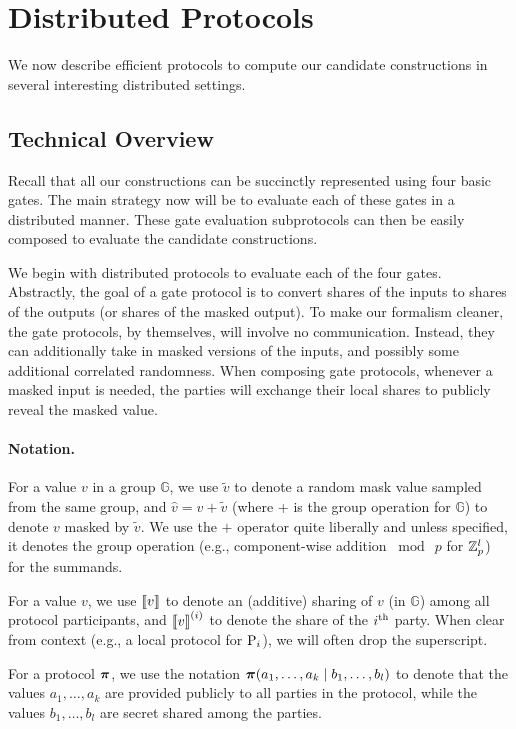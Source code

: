 \newpage
\section{Distributed Protocols}
\label{sec:distributed_protocols}
We now describe efficient protocols to compute our candidate constructions in several interesting distributed settings.

\subsection{Technical Overview}
Recall that all our constructions can be succinctly represented using four basic gates. The main strategy now will be to evaluate each of these gates in a distributed manner. These gate evaluation subprotocols can then be easily composed to evaluate the  candidate constructions. 

We begin with distributed protocols to evaluate each of the four gates. Abstractly, the goal of a gate protocol is to convert shares of the inputs to shares of the outputs (or shares of the masked output). To make our formalism cleaner, the gate protocols, by themselves, will involve no communication. Instead, they can additionally take in masked versions of the inputs, and possibly some additional correlated randomness. When composing gate protocols, whenever a masked input is needed, the parties will exchange their local shares to publicly reveal the masked value.

\paragraph{Notation.}
For a value $v$ in a group $\mathbb{G}$, we use $\tilde{v}$ to denote a random mask value sampled from the same group, and $\hat{v} = v + \tilde{v}$ (where + is the group operation for $\mathbb{G}$) to denote $v$ masked by $\tilde{v}$. We use the $+$ operator quite liberally and unless specified, it denotes the group operation (e.g., component-wise addition $\bmod~p$ for $\mathbb{Z}_p^l$) for the summands.

For a value $v$, we use $\left\llbracket v \right\rrbracket$ to denote an (additive) sharing of $v$ (in $\mathbb{G}$) among all protocol participants, and $\left\llbracket v \right\rrbracket^{(i)}$ to denote the share of the $i^{\textnormal{th}}$ party. When clear from context (e.g., a local protocol for $\textnormal{P}_i$), we will often drop the superscript. 

For a protocol $\boldsymbol{\pi}$, we use the notation $\boldsymbol{\pi}(a_1, \dots, a_k \mid b_1, \dots, b_l)$ to denote that the values $a_1, \dots, a_k$ are provided publicly to all parties in the protocol, while the values $b_1, \dots, b_l$ are secret shared among the parties.

